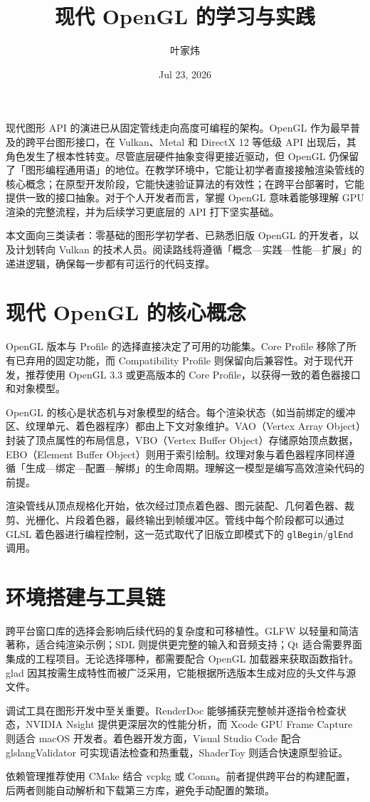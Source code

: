 \title{现代 OpenGL 的学习与实践}
\author{叶家炜}
\date{Jul 23, 2026}
\maketitle
现代图形 API 的演进已从固定管线走向高度可编程的架构。OpenGL 作为最早普及的跨平台图形接口，在 Vulkan、Metal 和 DirectX 12 等低级 API 出现后，其角色发生了根本性转变。尽管底层硬件抽象变得更接近驱动，但 OpenGL 仍保留了「图形编程通用语」的地位。在教学环境中，它能让初学者直接接触渲染管线的核心概念；在原型开发阶段，它能快速验证算法的有效性；在跨平台部署时，它能提供一致的接口抽象。对于个人开发者而言，掌握 OpenGL 意味着能够理解 GPU 渲染的完整流程，并为后续学习更底层的 API 打下坚实基础。\par
本文面向三类读者：零基础的图形学初学者、已熟悉旧版 OpenGL 的开发者，以及计划转向 Vulkan 的技术人员。阅读路线将遵循「概念—实践—性能—扩展」的递进逻辑，确保每一步都有可运行的代码支撑。\par
\chapter{现代 OpenGL 的核心概念}
OpenGL 版本与 Profile 的选择直接决定了可用的功能集。Core Profile 移除了所有已弃用的固定功能，而 Compatibility Profile 则保留向后兼容性。对于现代开发，推荐使用 OpenGL 3.3 或更高版本的 Core Profile，以获得一致的着色器接口和对象模型。\par
OpenGL 的核心是状态机与对象模型的结合。每个渲染状态（如当前绑定的缓冲区、纹理单元、着色器程序）都由上下文对象维护。VAO（Vertex Array Object）封装了顶点属性的布局信息，VBO（Vertex Buffer Object）存储原始顶点数据，EBO（Element Buffer Object）则用于索引绘制。纹理对象与着色器程序同样遵循「生成—绑定—配置—解绑」的生命周期。理解这一模型是编写高效渲染代码的前提。\par
渲染管线从顶点规格化开始，依次经过顶点着色器、图元装配、几何着色器、裁剪、光栅化、片段着色器，最终输出到帧缓冲区。管线中每个阶段都可以通过 GLSL 着色器进行编程控制，这一范式取代了旧版立即模式下的 \texttt{glBegin}/\texttt{glEnd} 调用。\par
\chapter{环境搭建与工具链}
跨平台窗口库的选择会影响后续代码的复杂度和可移植性。GLFW 以轻量和简洁著称，适合纯渲染示例；SDL 则提供更完整的输入和音频支持；Qt 适合需要界面集成的工程项目。无论选择哪种，都需要配合 OpenGL 加载器来获取函数指针。glad 因其按需生成特性而被广泛采用，它能根据所选版本生成对应的头文件与源文件。\par
调试工具在图形开发中至关重要。RenderDoc 能够捕获完整帧并逐指令检查状态，NVIDIA Nsight 提供更深层次的性能分析，而 Xcode GPU Frame Capture 则适合 macOS 开发者。着色器开发方面，Visual Studio Code 配合 glslangValidator 可实现语法检查和热重载，ShaderToy 则适合快速原型验证。\par
依赖管理推荐使用 CMake 结合 vcpkg 或 Conan。前者提供跨平台的构建配置，后两者则能自动解析和下载第三方库，避免手动配置的繁琐。\par
